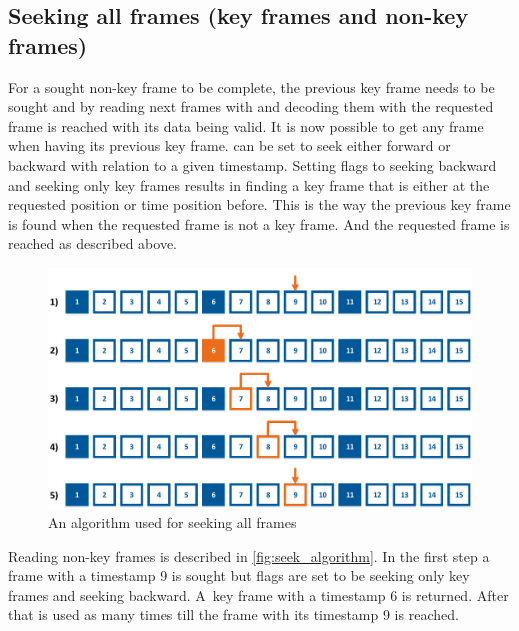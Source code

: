 \subsection{Seeking all frames (key frames and non-key frames)}
For a sought non-key frame to be complete, the previous key frame needs to be sought and by reading next frames with  and decoding them with  the requested frame is reached with its data being valid. It is now possible to get any frame when having its previous key frame.  can be set to seek either forward or backward with relation to a given timestamp. Setting flags to seeking backward and seeking only key frames results in finding a key frame that is either at the requested position or time position before. This is the way the previous key frame is found when the requested frame is not a key frame. And the requested frame is reached as described above. 
\begin{figure}[!htbp]
\centering
\includegraphics[width=\textwidth]{fig/seeking_algorithm}
\caption{An algorithm used for seeking all frames}
\label{fig:seek_algorithm}
\end{figure}
Reading non-key frames is described in \autoref{fig:seek_algorithm}. In the first step a frame with a timestamp 9 is sought but flags are set to be seeking only key frames and seeking backward. A~key frame with a timestamp 6 is returned. After that  is used as many times till the frame with its timestamp 9 is reached.

